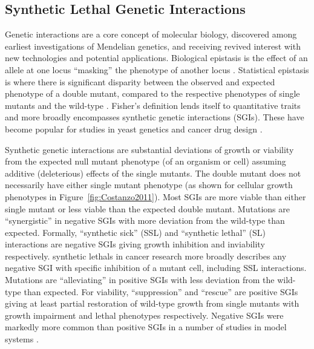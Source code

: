\subsection{Synthetic Lethal Genetic Interactions}
Genetic interactions are a core concept of molecular biology, discovered among earliest investigations of Mendelian genetics, and receiving revived interest with new technologies and potential applications. Biological epistasis is the effect of an allele at one locus ``masking'' the phenotype of another locus \citep{Bateson1909}. Statistical epistasis is where there is significant disparity between the observed and expected phenotype of a double mutant, compared to the respective phenotypes of single mutants and the wild-type \citep{Fisher1919}. Fisher's definition lends itself to quantitative traits and more broadly encompasses synthetic genetic interactions (\glspl{SGI}). These have become popular for studies in yeast genetics and cancer drug design \citep{Boone2007, Kaelin2005}.


Synthetic genetic interactions are substantial deviations of growth or viability from the expected null mutant phenotype (of an organism or cell) assuming additive (deleterious) effects of the single mutants. The double mutant does not necessarily have either single mutant phenotype (as shown for cellular growth phenotypes in Figure~\ref{fig:Costanzo2011}). Most \glspl{SGI} are more viable than either single mutant or less viable than the expected double mutant. Mutations are ``synergistic'' in negative \glspl{SGI} with more deviation from the wild-type than expected. Formally, ``synthetic sick'' (SSL) and ``synthetic lethal'' (SL) interactions are negative \glspl{SGI} giving growth inhibition and inviability respectively. \Glspl{synthetic lethal} in cancer research more broadly describes any negative \gls{SGI} with specific inhibition of a mutant cell, including SSL interactions. Mutations are ``alleviating'' in positive \glspl{SGI} with less deviation from the wild-type than expected. For viability, ``suppression'' and ``rescue'' are positive \glspl{SGI} giving at least partial restoration of wild-type growth from single mutants with growth impairment and lethal phenotypes respectively. Negative \glspl{SGI} were markedly more common than positive \glspl{SGI} in a number of studies in model systems \citet{Tong2004, Boucher2013}. 

